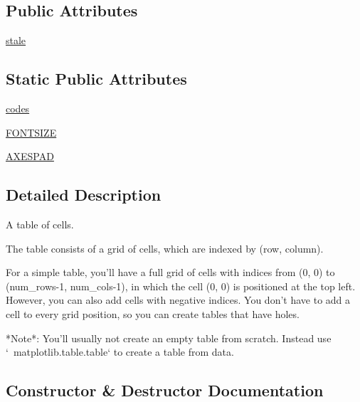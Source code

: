 \subsection*{Public Attributes}
\begin{DoxyCompactItemize}
\item 
\hyperlink{classmatplotlib_1_1table_1_1Table_af7cbecc998f025a51db935d4be174e83}{stale}
\end{DoxyCompactItemize}
\subsection*{Static Public Attributes}
\begin{DoxyCompactItemize}
\item 
\hyperlink{classmatplotlib_1_1table_1_1Table_a35ffdad9bb93088b7137348c728009a9}{codes}
\item 
\hyperlink{classmatplotlib_1_1table_1_1Table_a81ebc332e35289ae4ce4d7063d6285f0}{F\+O\+N\+T\+S\+I\+ZE}
\item 
\hyperlink{classmatplotlib_1_1table_1_1Table_a8f80e5c1118faf3f1a3189ceb34a8953}{A\+X\+E\+S\+P\+AD}
\end{DoxyCompactItemize}


\subsection{Detailed Description}
\begin{DoxyVerb}A table of cells.

The table consists of a grid of cells, which are indexed by (row, column).

For a simple table, you'll have a full grid of cells with indices from
(0, 0) to (num_rows-1, num_cols-1), in which the cell (0, 0) is positioned
at the top left. However, you can also add cells with negative indices.
You don't have to add a cell to every grid position, so you can create
tables that have holes.

*Note*: You'll usually not create an empty table from scratch. Instead use
`~matplotlib.table.table` to create a table from data.
\end{DoxyVerb}
 

\subsection{Constructor \& Destructor Documentation}
\mbox{\label{classmatplotlib_1_1table_1_1Table_afa7c25d35cad9a3687e65c3cfd55277e}} 
